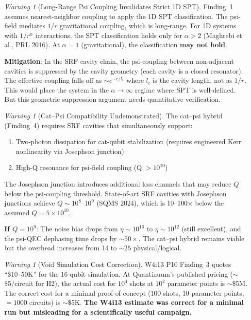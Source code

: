 \documentclass[11pt]{article}
\theoremstyle{definition}
\theoremstyle{remark}
\newtheorem{warning}[theorem]{Warning}
\newcommand{\ee}[1]{\times 10^{#1}}
\begin{document}
\begin{warning}[Long-Range Psi Coupling Invalidates Strict 1D SPT]
\label{warn:long-range}
Finding~1 assumes nearest-neighbor coupling to apply the 1D SPT
classification.  The psi-field mediates $1/r$ gravitational coupling,
which is long-range.  For 1D systems with $1/r^\alpha$ interactions,
the SPT classification holds only for $\alpha > 2$ (Maghrebi et al.,
PRL 2016).  At $\alpha = 1$ (gravitational), the classification
\textbf{may not hold}.

\textbf{Mitigation}: In the SRF cavity chain, the psi-coupling between
non-adjacent cavities is suppressed by the cavity geometry (each cavity
is a closed resonator).  The effective coupling falls off as
$\sim e^{-r/l_c}$ where $l_c$ is the cavity length, not as $1/r$.
This would place the system in the $\alpha \to \infty$ regime where
SPT is well-defined.  But this geometric suppression argument needs
quantitative verification.
\end{warning}

\begin{warning}[Cat--Psi Compatibility Undemonstrated]
\label{warn:cat-psi-compat}
The cat--psi hybrid (Finding~4) requires SRF cavities that simultaneously
support:
\begin{enumerate}[nosep]
  \item Two-photon dissipation for cat-qubit stabilization
    (requires engineered Kerr nonlinearity via Josephson junction)
  \item High-Q resonance for psi-field coupling (Q $> 10^{10}$)
\end{enumerate}
The Josephson junction introduces additional loss channels that may
reduce $Q$ below the psi-coupling threshold.  State-of-art SRF cavities
with Josephson junctions achieve $Q \sim 10^8$--$10^9$ (SQMS 2024),
which is 10--100$\times$ below the assumed $Q = 5\ee{10}$.

\textbf{If $Q = 10^9$}: The noise bias drops from $\eta \sim 10^{16}$
to $\eta \sim 10^{12}$ (still excellent), and the psi-QEC dephasing time
drops by $\sim 50\times$.  The cat--psi hybrid remains viable but the
overhead increases from 14 to $\sim 25$ physical/logical.
\end{warning}

\begin{warning}[Void Simulation Cost Correction]
\label{warn:void-cost}
W4i13 P10 Finding~3 quotes ``\$10--50K'' for the 16-qubit simulation.
At Quantinuum's published pricing ($\sim$\$5/circuit for H2), the
actual cost for $10^4$ shots at $10^2$ parameter points is
$\sim$\$5M.  The correct cost for a minimal proof-of-concept
(100 shots, 10 parameter points, $= 1000$ circuits) is $\sim$\$5K.
\textbf{The W4i13 estimate was correct for a minimal run but misleading
for a scientifically useful campaign.}
\end{warning}
\end{document}
